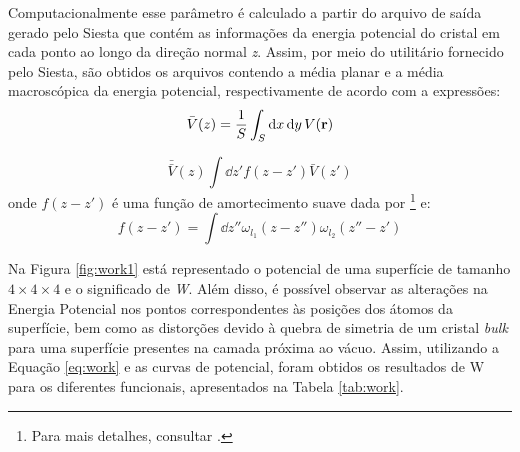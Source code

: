 Computacionalmente esse parâmetro é calculado a partir do arquivo de saída gerado pelo Siesta que contém as informações da energia potencial do cristal em cada ponto ao longo da direção normal \textit{z}. Assim, por meio do utilitário fornecido pelo Siesta, são obtidos os arquivos contendo a média planar e a média macroscópica da energia potencial, respectivamente de acordo com a expressões:
\begin{equation}\label{eq:planar}
	\bar{V}(z)=\frac{1}{S}\int_{S}\dd{x}\dd{y}V(\vb{r})
\end{equation}

\begin{equation}\label{eq:macro}
	\bar{\bar{V}}(z)\int \dd{z'}f(z-z')\bar{V}(z')
\end{equation}
onde $ f(z-z') $ é uma função de amortecimento suave dada por \footnote{Para mais detalhes, consultar \citeauthor{planar}.}  e:
\begin{equation}
	f(z-z')=\int \dd{z''}\omega_{l_1}(z-z'')\omega_{l_2}(z''-z')
\end{equation}

Na Figura \ref{fig:work1} está representado o potencial de uma superfície de tamanho  $4\times4\times4$ e o significado de \textit{W}. Além disso, é possível observar as alterações na Energia Potencial nos pontos correspondentes às posições dos átomos da superfície, bem como as distorções devido à quebra de simetria de um cristal \textit{bulk} para uma superfície presentes na camada próxima ao vácuo. Assim, utilizando a Equação \eqref{eq:work} e as curvas de potencial, foram obtidos os resultados de W para os diferentes funcionais, apresentados na Tabela \ref{tab:work}. 

